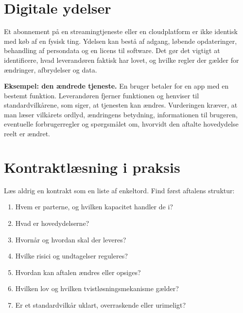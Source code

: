 \section{Digitale ydelser}

Et abonnement på en streamingtjeneste eller en cloudplatform er ikke identisk med køb af en fysisk ting. Ydelsen kan bestå af adgang, løbende opdateringer, behandling af persondata og en licens til software. Det gør det vigtigt at identificere, hvad leverandøren faktisk har lovet, og hvilke regler der gælder for ændringer, afbrydelser og data.

\begin{examplebox}
\textbf{Eksempel: den ændrede tjeneste.} En bruger betaler for en app med en bestemt funktion. Leverandøren fjerner funktionen og henviser til standardvilkårene, som siger, at tjenesten kan ændres. Vurderingen kræver, at man læser vilkårets ordlyd, ændringens betydning, informationen til brugeren, eventuelle forbrugerregler og spørgsmålet om, hvorvidt den aftalte hovedydelse reelt er ændret.
\end{examplebox}

\section{Kontraktlæsning i praksis}

Læs aldrig en kontrakt som en liste af enkeltord. Find først aftalens struktur:
\begin{enumerate}
  \item Hvem er parterne, og hvilken kapacitet handler de i?
  \item Hvad er hovedydelserne?
  \item Hvornår og hvordan skal der leveres?
  \item Hvilke risici og undtagelser reguleres?
  \item Hvordan kan aftalen ændres eller opsiges?
  \item Hvilken lov og hvilken tvistløsningsmekanisme gælder?
  \item Er et standardvilkår uklart, overraskende eller urimeligt?
\end{enumerate}



